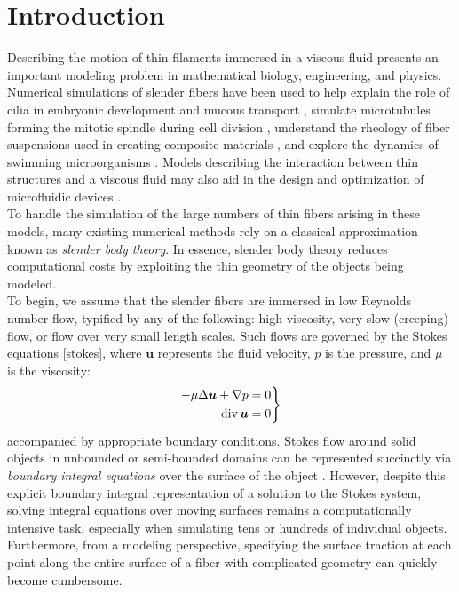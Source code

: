 \documentclass[11pt]{article}
\numberwithin{equation}{section}
\newcommand{\bu}{\bm{u}}
\newcommand{\ts}{\thinspace}
\newcommand{\dive}{{\rm{div}}}
\theoremstyle{definition}
\begin{document}
\tableofcontents

\section{Introduction}
Describing the motion of thin filaments immersed in a viscous fluid presents an important modeling problem in mathematical biology, engineering, and physics. Numerical simulations of slender fibers have been used to help explain the role of cilia in embryonic development \cite{smith2011mathematical} and mucous transport \cite{smith2007discrete}, simulate microtubules forming the mitotic spindle during cell division \cite{shelley2016dynamics}, understand the rheology of fiber suspensions used in creating composite materials \cite{fan1998direct, hamalainen2011papermaking, petrie1999rheology}, and explore the dynamics of swimming microorganisms \cite{gueron1997cilia, lauga2009hydrodynamics, nguyen2011action, rodenborn2013propulsion, saintillan2011emergence, spagnolie2011comparative}. Models describing the interaction between thin structures and a viscous fluid may also aid in the design and optimization of microfluidic devices \cite{avron2008geometric, becker2003self, buchmann2015flow, dreyfus2005microscopic}. \\

To handle the simulation of the large numbers of thin fibers arising in these models, many existing numerical methods rely on a classical approximation known as \emph{slender body theory}. In essence, slender body theory reduces computational costs by exploiting the thin geometry of the objects being modeled. \\

To begin, we assume that the slender fibers are immersed in low Reynolds number flow, typified by any of the following: high viscosity, very slow (creeping) flow, or flow over very small length scales. Such flows are governed by the Stokes equations \eqref{stokes}, where $\bu$ represents the fluid velocity, $p$ is the pressure, and $\mu$ is the viscosity: 
\begin{equation}
\left.
\begin{aligned}
-\mu \Delta \bu +\nabla p &= 0 \\
\dive \ts \bu &=0
\end{aligned}
\right\rbrace
\label{stokes}
 \end{equation}
 accompanied by appropriate boundary conditions. Stokes flow around solid objects in unbounded or semi-bounded domains can be represented succinctly via \emph{boundary integral equations} over the surface of the object \cite{pozrikidis1992boundary}. However, despite this explicit boundary integral representation of a solution to the Stokes system, solving integral equations over moving surfaces remains a computationally intensive task, especially when simulating tens or hundreds of individual objects. Furthermore, from a modeling perspective, specifying the surface traction at each point along the entire surface of a fiber with complicated geometry can quickly become cumbersome.  \\
\end{document}
